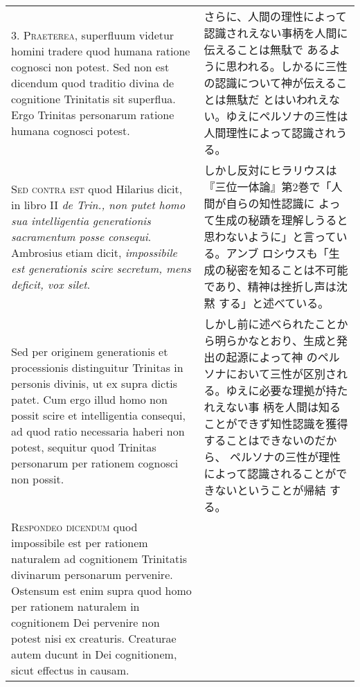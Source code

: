 \documentclass[10pt]{jsarticle} %
\begin{document}
\begin{longtable}{p{21em}p{21em}}
3. {\scshape Praeterea}, superfluum videtur homini tradere quod humana ratione
cognosci non potest. Sed non est dicendum quod traditio divina de
cognitione Trinitatis sit superflua. Ergo Trinitas personarum ratione
humana cognosci potest.


&

さらに、人間の理性によって認識されえない事柄を人間に伝えることは無駄で
 あるように思われる。しかるに三性の認識について神が伝えることは無駄だ
 とはいわれえない。ゆえにペルソナの三性は人間理性によって認識されうる。


\\



{\scshape Sed contra est} quod Hilarius dicit, in libro II {\itshape de Trin., non putet
homo sua intelligentia generationis sacramentum posse
consequi}. Ambrosius etiam dicit, {\itshape impossibile est generationis scire
secretum, mens deficit, vox silet}. 


&

しかし反対にヒラリウスは『三位一体論』第2巻で「人間が自らの知性認識に
 よって生成の秘蹟を理解しうると思わないように」と言っている。アンブ
 ロシウスも「生成の秘密を知ることは不可能であり、精神は挫折し声は沈黙
 する」と述べている。


\\


Sed per originem generationis et
processionis distinguitur Trinitas in personis divinis, ut ex supra
dictis patet. Cum ergo illud homo non possit scire et intelligentia
consequi, ad quod ratio necessaria haberi non potest, sequitur quod
Trinitas personarum per rationem cognosci non possit.


&

しかし前に述べられたことから明らかなとおり、生成と発出の起源によって神
 のペルソナにおいて三性が区別される。ゆえに必要な理拠が持たれえない事
 柄を人間は知ることができず知性認識を獲得することはできないのだから、
 ペルソナの三性が理性によって認識されることができないということが帰結
 する。


\\



{\scshape Respondeo dicendum} quod impossibile est per rationem naturalem ad
cognitionem Trinitatis divinarum personarum pervenire. Ostensum est
enim supra quod homo per rationem naturalem in cognitionem Dei
pervenire non potest nisi ex creaturis. Creaturae autem ducunt in Dei
cognitionem, sicut effectus in causam. 


&


\end{longtable}
\end{document}
